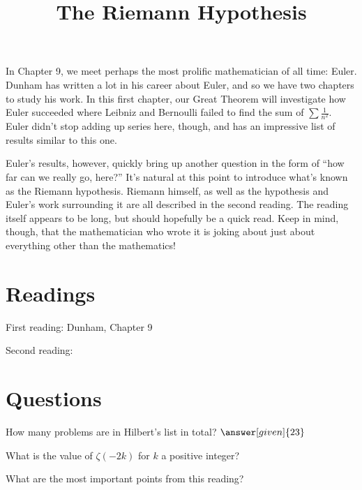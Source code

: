 \documentclass[nooutcomes]{ximera}
\title{The Riemann Hypothesis}
\begin{document}
\begin{abstract}
    
\end{abstract}
\maketitle

In Chapter 9, we meet perhaps the most prolific mathematician of all time: Euler.  Dunham has written a lot in his career about Euler, and so we have two chapters to study his work.  In this first chapter, our Great Theorem will investigate how Euler succeeded where Leibniz and Bernoulli failed to find the sum of $\sum \frac{1}{n^2}$.  Euler didn't stop adding up series here, though, and has an impressive list of results similar to this one.

Euler's results, however, quickly bring up another question in the form of ``how far can we really go, here?''  It's natural at this point to introduce what's known as the Riemann hypothesis.  Riemann himself, as well as the hypothesis and Euler's work surrounding it are all described in the second reading.  The reading itself appears to be long, but should hopefully be a quick read.  Keep in mind, though, that the mathematician who wrote it is joking about just about everything other than the mathematics!


\section{Readings}
First reading: Dunham, Chapter 9

Second reading: 



\section{Questions}

\begin{question}
How many problems are in Hilbert's list in total? $\answer[given]{23}$
\end{question}

\begin{question}
What is the value of $\zeta(-2k)$ for $k$ a positive integer?
\begin{multipleChoice}
\end{multipleChoice}
\end{question}


\begin{question}
What are the most important points from this reading?
\begin{freeResponse}
\end{freeResponse}

\end{question}
\end{document}
